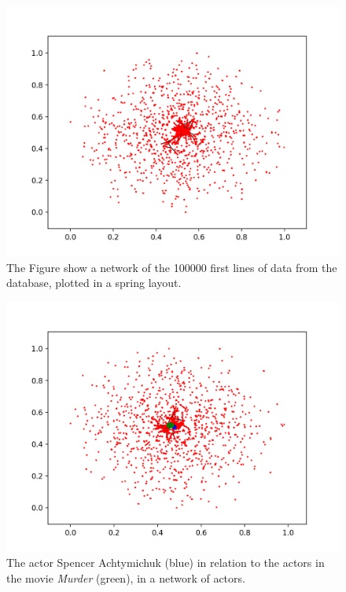 \documentclass[12pt]{ieeeconf}      %
\begin{document}
\begin{figure}[H]
  \begin{center}
   \includegraphics[width=.75\textwidth]{figures/network-100k}
    \caption{The Figure show a network of the 100000 first lines of data from the database, plotted in a spring layout.}
    \label{network:100k}
  \end{center}
\end{figure} 

\begin{figure}[H]
  \begin{center}
   \includegraphics[width=.75\textwidth]{figures/network-famous}
    \caption{The actor Spencer Achtymichuk (blue) in relation to the actors in the movie \textit{Murder} (green), in a network of actors.}
    \label{network:famous}
  \end{center}
\end{figure} 
\end{document}
